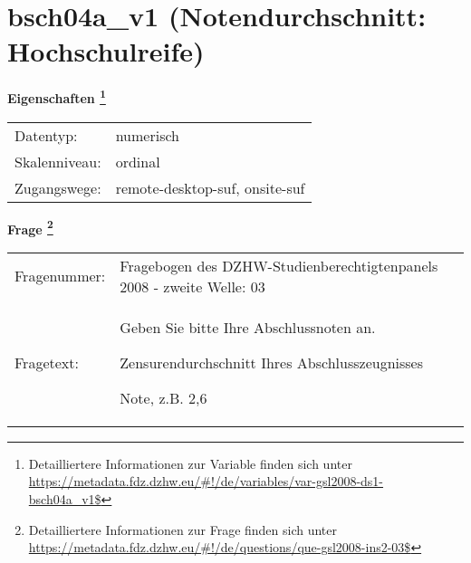 
    \setcounter{footnote}{0}

    \vspace*{-1.8cm}
	\section{bsch04a\_v1 (Notendurchschnitt: Hochschulreife)}
	\label{section:bsch04a_v1}



    \vspace*{0.5cm}
    \noindent\textbf{Eigenschaften
	\footnote{Detailliertere Informationen zur Variable finden sich unter
		\url{https://metadata.fdz.dzhw.eu/\#!/de/variables/var-gsl2008-ds1-bsch04a_v1$}}}\\
	\begin{tabularx}{\hsize}{@{}lX}
	Datentyp: & numerisch \\
	Skalenniveau: & ordinal \\
	Zugangswege: &
	  remote-desktop-suf, 
	  onsite-suf
 \\
    \end{tabularx}



				\vspace*{0.5cm}
                \noindent\textbf{Frage
	                \footnote{Detailliertere Informationen zur Frage finden sich unter
		              \url{https://metadata.fdz.dzhw.eu/\#!/de/questions/que-gsl2008-ins2-03$}}}\\
				\begin{tabularx}{\hsize}{@{}lX}
					Fragenummer: &
					  Fragebogen des DZHW-Studienberechtigtenpanels 2008 - zweite Welle:
					  03
 \\
					Fragetext: & Geben Sie bitte Ihre Abschlussnoten an.\par  Zensurendurchschnitt Ihres Abschlusszeugnisses\par  Note, z.B. 2,6 \\
				\end{tabularx}





